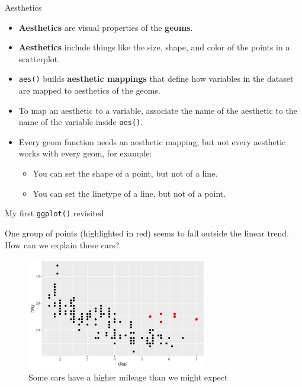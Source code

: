 \documentclass[ignorenonframetext,]{beamer}
\providecommand{\tightlist}{%
  \setlength{\itemsep}{0pt}\setlength{\parskip}{0pt}}
\begin{document}
\begin{frame}[fragile]{Aesthetics}
\protect\hypertarget{aesthetics}{}

\begin{itemize}
\item
  \textbf{Aesthetics} are visual properties of the \textbf{geoms}.
\item
  \textbf{Aesthetics} include things like the size, shape, and color of
  the points in a scatterplot.
\item
  \texttt{aes()} builds \textbf{aesthetic mappings} that define how
  variables in the dataset are mapped to aesthetics of the geoms.
\item
  To map an aesthetic to a variable, associate the name of the aesthetic
  to the name of the variable inside \texttt{aes()}.
\item
  Every geom function needs an aesthetic mapping, but not every
  aesthetic works with every geom, for example:

  \begin{itemize}
  \tightlist
  \item
    You can set the shape of a point, but not of a line.
  \item
    You can set the linetype of a line, but not of a point.
  \end{itemize}
\end{itemize}

\end{frame}

\begin{frame}{My first \texttt{ggplot()} revisited}
\protect\hypertarget{my-first-ggplot-revisited}{}

One group of points (highlighted in red) seems to fall outside the
linear trend. How can we explain these cars?

\begin{figure}
\centering
\includegraphics[width=3.125in,height=\textheight]{outl.png}
\caption{Some cars have a higher mileage than we might expect}
\end{figure}

\end{frame}
\end{document}
